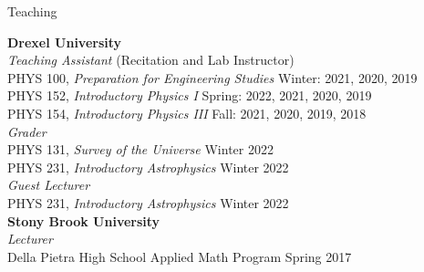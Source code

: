 \documentclass{resume} %
\newcommand{\forceindent}{\leavevmode{\parindent=1em\indent}}
\begin{document}
\begin{rSection}{Teaching}

\textbf{Drexel University} \\ 
\textit{Teaching Assistant} (Recitation and Lab Instructor)\\
\forceindent PHYS 100, \textit{Preparation for Engineering Studies}  \hfill {Winter: 2021, 2020, 2019}\\
\forceindent PHYS 152, \textit{Introductory Physics I}  \hfill {Spring: 2022, 2021, 2020, 2019}\\
\forceindent PHYS 154, \textit{Introductory Physics III}  \hfill {Fall: 2021, 2020, 2019, 2018}\\
\textit{Grader} \\
\forceindent PHYS 131, \textit{Survey of the Universe} \hfill {Winter 2022}\\
\forceindent PHYS 231, \textit{Introductory Astrophysics} \hfill {Winter 2022}\\
\textit{Guest Lecturer} \\
\forceindent PHYS 231, \textit{Introductory Astrophysics} \hfill {Winter 2022}\\
\textbf{Stony Brook University} \\
\textit{Lecturer}\\
\forceindent  Della Pietra High School Applied Math Program \hfill {Spring 2017}

\end{rSection}

\end{document}
